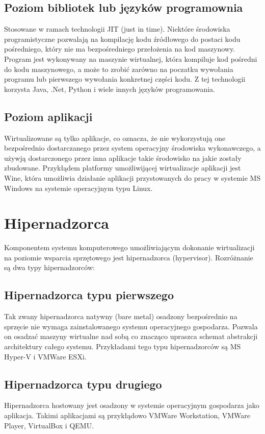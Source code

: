 \documentclass[polish, a4paper, 12pt, oneside]{book}
\begin{document}
\subsection {Poziom bibliotek lub języków programownia}
Stosowane w ramach technologii JIT (just in time). Niektóre środowiska programistyczne pozwalają na kompilację kodu źródłowego do postaci kodu pośredniego, który nie ma bezpośredniego przełożenia na kod maszynowy. Program jest wykonywany na maszynie wirtualnej, która kompiluje kod pośredni do kodu maszynowego, a może to zrobić zarówno na poczatku wywołania programu lub pierwszego wywołania konkretnej części kodu. Z tej technologii korzysta Java, .Net, Python i wiele innych języków programowania. 
\subsection {Poziom aplikacji}
Wirtualizowane są tylko aplikacje, co oznacza, że nie wykorzystują one bezpośrednio dostarczanego przez system operacyjny środowiska wykonawczego, a używją dostarczonego przez inna aplikacje takie środowisko na jakie zostały zbudowane. Przykłądem platformy umożliwijącej wirtualizacje aplikacji jest Wine, która umożliwia działanie aplikacji przystowanych do pracy w systemie MS Windows na systemie operacyjnym typu Linux.
 
\section{Hipernadzorca}
Komponentem systemu komputerowego umożliwiającym dokonanie wirtualizacji na poziomie wsparcia sprzętowego jest hipernadzorca (hypervisor). Rozróżnanie są dwa typy hipernadzorców:

\subsection {Hipernadzorca typu pierwszego} 
Tak zwany hipernadzorca natywny (bare metal) osadzony bezpośrednio na sprzęcie nie wymaga zainstalowanego systemu operacyjnego gospodarza. Pozwala on osadzać maszyny wirtualne nad sobą co znacząco upraszca schemat abstrakcji architektury całego systemu. Przykładami tego typu hipernadzorców są MS Hyper-V i VMWare ESXi.

\subsection {Hipernadzorca typu drugiego} 
Hipernadzorca hostowany jest osadzony w systemie operacyjnym gospodarza jako aplikacja. Takimi aplikacjami są przykłądowo VMWare Workstation, VMWare Player, VirtualBox i QEMU.
\end{document}
